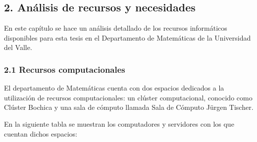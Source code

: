 \begin{spacing}{1.5}
  \begin{tightcenter}
    \section{2. Análisis de recursos y necesidades}
    \label{chap:recursos-necesidades}
    \mylinespacing
  \end{tightcenter}

  En este capítulo se hace un análisis detallado de los recursos informáticos disponibles para esta tesis en el Departamento de Matemáticas de la Universidad del Valle.

  \subsubsection{2.1 Recursos computacionales}
  El departamento de Matemáticas cuenta con dos espacios dedicados a la utilización de recursos computacionales: un clúster computacional, conocido como Clúster Bochica y una sala de cómputo llamada Sala de Cómputo Jürgen Tischer.

  En la siguiente tabla se muestran los computadores y servidores con los que cuentan dichos espacios:
  \vspace{3mm}


\end{spacing}
